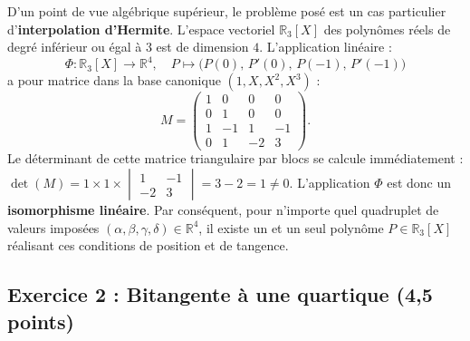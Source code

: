 \documentclass[11pt,a4paper]{article}
\newcommand{\R}{\mathbb{R}}
\begin{document}
\begin{remarquebox}
D'un point de vue algébrique supérieur, le problème posé est un cas particulier d'\textbf{interpolation d'Hermite}.
L'espace vectoriel $\R_3[X]$ des polynômes réels de degré inférieur ou égal à $3$ est de dimension $4$. L'application linéaire :
\[
\Phi : \R_3[X] \longrightarrow \R^4, \quad P \longmapsto \bigl(P(0), \, P'(0), \, P(-1), \, P'(-1)\bigr)
\]
a pour matrice dans la base canonique $(1, X, X^2, X^3)$ :
\[
M = \begin{pmatrix}
1 & 0 & 0 & 0 \\
0 & 1 & 0 & 0 \\
1 & -1 & 1 & -1 \\
0 & 1 & -2 & 3
\end{pmatrix}.
\]
Le déterminant de cette matrice triangulaire par blocs se calcule immédiatement : $\det(M) = 1 \times 1 \times \begin{vmatrix} 1 & -1 \\ -2 & 3 \end{vmatrix} = 3 - 2 = 1 \neq 0$.
L'application $\Phi$ est donc un \textbf{isomorphisme linéaire}. Par conséquent, pour n'importe quel quadruplet de valeurs imposées $(\alpha, \beta, \gamma, \delta) \in \R^4$, il existe un et un seul polynôme $P \in \R_3[X]$ réalisant ces conditions de position et de tangence.
\end{remarquebox}

\vspace{0.4cm}

\subsection*{Exercice 2 : Bitangente à une quartique \hfill \normalfont\normalsize (4{,}5 points)}
\end{document}
